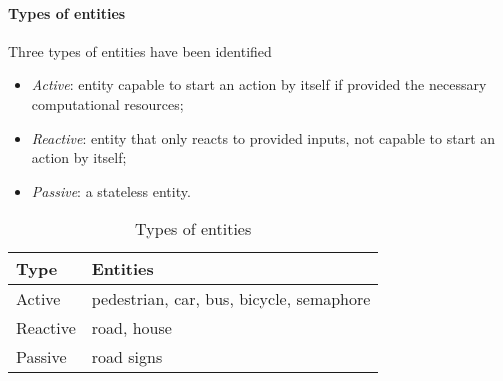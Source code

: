 \paragraph{Types of entities}
Three types of entities have been identified
\begin{itemize}
  \item \textit{Active}: entity capable to start an action by itself if provided 
the necessary computational resources;
  \item \textit{Reactive}: entity that only reacts to provided inputs, 
not capable to start an action by itself;
  \item \textit{Passive}: a stateless entity.
\end{itemize}
\begin{table}[H]
\centering
\begin{tabular}{|l|l|}
\hline
\rowcolor{BlueGreen}
Type     & Entities                                 \\ \hline
Active   & pedestrian, car, bus, bicycle, semaphore \\ \hline
Reactive & road, house                              \\ \hline
Passive  & road signs                               \\ \hline
\end{tabular}
\caption{Types of entities}
\label{tab:entity_type}
\end{table}
